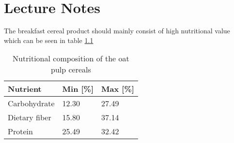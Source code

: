 \chapter{Lecture Notes}
\setlength{\headheight}{12.71342pt}
\addtolength{\topmargin}{-0.71342pt}

The breakfast cereal product should mainly consist of high nutritional value which can be seen in table \ref*{tab:nutritional_composition}

\begin{table}[H]
    \centering
    \caption{Nutritional composition of the oat pulp cereals}
    \label{tab:nutritional_composition}
    \begin{tabular}{lll}

    \textbf{Nutrient}   & \textbf{Min [\%]}  & \textbf{Max [\%]} \\ \hline
    Carbohydrate        & 12.30              & 27.49       \\ 
    Dietary fiber       & 15.80              & 37.14       \\ 
    Protein             & 25.49              & 32.42       \\ 

    \end{tabular}
\end{table}